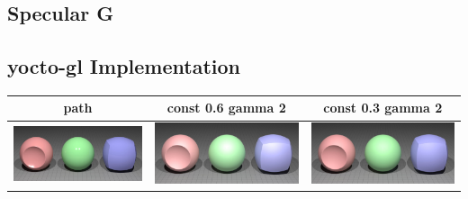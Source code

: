 \documentclass[11pt]{article}
\begin{document}
\subsection{Specular G}
\subsection{yocto-gl Implementation}

\begin{table}[ht]
  \centering
  \begin{tabular}{ | c | c | c |}
    \hline
    path & const 0.6 gamma 2 & const 0.3 gamma 2 \\ \hline
    \begin{minipage}{.3\textwidth}
      \includegraphics[scale=0.1]{img/obj/basic_pl/basic_pl.jpg}
    \end{minipage}
    &
    \begin{minipage}{.3\textwidth}
      \includegraphics[scale=0.1]{img/obj/basic_pl/basic_pl_disney.jpg}
    \end{minipage}
    & 
    \begin{minipage}{.3\textwidth}
      \includegraphics[scale=0.1]{img/obj/basic_pl/basic_pl_disney_dc03.jpg}
    \end{minipage}
    \\ \hline
  \end{tabular}
\end{table}
\end{document}
